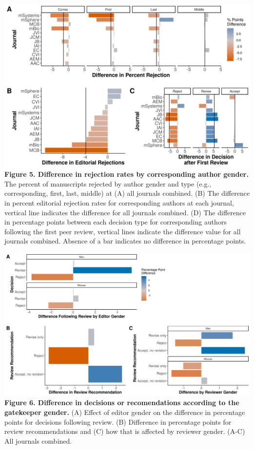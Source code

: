 \documentclass[11pt,]{article}
\begin{document}
\includegraphics{Figure_4.png} \textbf{Figure 5. Difference in rejection
rates by corresponding author gender.} The percent of manuscripts
rejected by author gender and type (e.g., corresponding, first, last,
middle) at (A) all journals combined. (B) The difference in percent
editorial rejection rates for corresponding authors at each journal,
vertical line indicates the difference for all journals combined. (D)
The difference in percentage points between each decision type for
corresponding authors following the first peer review, vertical lines
indicate the difference value for all journals combined. Absence of a
bar indicates no difference in percentage points.

\newpage

\includegraphics{Figure_5.png} \textbf{Figure 6. Difference in decisions
or recomendations according to the gatekeeper gender.} (A) Effect of
editor gender on the difference in percentage points for decisions
following review. (B) Difference in percentage points for review
recommendations and (C) how that is affected by reviewer gender. (A-C)
All journals combined.
\end{document}
